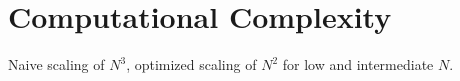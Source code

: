 \documentclass[a4paper,fleqn,usenatbib]{mnras}
\begin{document}








\appendix

\section{Computational Complexity}
Naive scaling of $N^3$, optimized scaling of $N^2$ for low and intermediate $N$.






\bsp	%
\label{lastpage}
\end{document}
